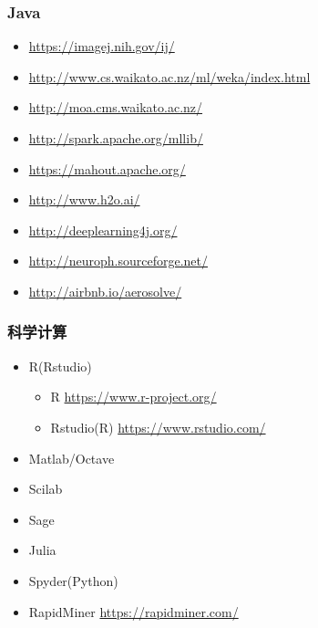 \documentclass{beamer}
\begin{document}
\begin{frame}
\frametitle{Java}
\label{sec-5-5}

\begin{itemize}
\item \href{https://imagej.nih.gov/ij/}{https://imagej.nih.gov/ij/}
\item \href{http://www.cs.waikato.ac.nz/ml/weka/index.html}{http://www.cs.waikato.ac.nz/ml/weka/index.html}
\item \href{http://moa.cms.waikato.ac.nz/}{http://moa.cms.waikato.ac.nz/}
\item \href{http://spark.apache.org/mllib/}{http://spark.apache.org/mllib/}
\item \href{https://mahout.apache.org/}{https://mahout.apache.org/}
\item \href{http://www.h2o.ai/}{http://www.h2o.ai/}
\item \href{http://deeplearning4j.org/}{http://deeplearning4j.org/}
\item \href{http://neuroph.sourceforge.net/}{http://neuroph.sourceforge.net/}
\item \href{http://airbnb.io/aerosolve/}{http://airbnb.io/aerosolve/}
\end{itemize}
\end{frame}
\begin{frame}
\frametitle{科学计算}
\label{sec-5-6}

\begin{itemize}
\item R(Rstudio)
\begin{itemize}
\item R \href{https://www.r-project.org/}{https://www.r-project.org/}
\item Rstudio(R)  \href{https://www.rstudio.com/}{https://www.rstudio.com/}
\end{itemize}
\item Matlab/Octave
\item Scilab
\item Sage
\item Julia
\item Spyder(Python)
\item RapidMiner \href{https://rapidminer.com/}{https://rapidminer.com/}
\end{itemize}
\end{frame}
\end{document}
